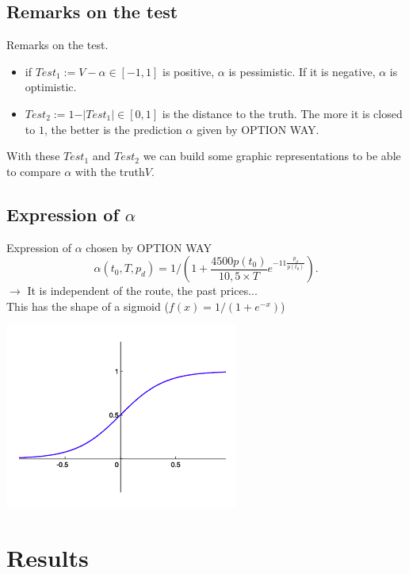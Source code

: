 \documentclass{beamer}
\begin{document}
\subsection{Remarks on the test}
\frame
{
Remarks on the test.
\begin{itemize}
\item if $Test_1:=V-\alpha \in [-1,1]$ is positive, $\alpha$ is pessimistic. If it is negative, $\alpha$ is optimistic.
\item $Test_2:=1-\vert Test_1\vert \in [0,1]$ is the distance to the truth. The more it is closed to $1$, the better is the prediction $\alpha$ given by OPTION WAY. 
\end{itemize}
With these $Test_1$ and $Test_2$ we can build some graphic representations  to be able to compare $\alpha$ with the truth$V$. \\

}
\subsection{Expression of $\alpha$}
\frame
{
Expression of $\alpha$ chosen by OPTION WAY
$$\alpha(t_0,T,p_d)=1/(1+\frac{4500p(t_0)}{10,5\times T}e^{-11\frac{p_d}{p(t_0)}}).$$
$\to$ It is independent of the route, the past prices...\\
This has the shape of a sigmoid ($f(x)=1/(1+e^{-x})$)
\hspace{0.4cm}
\begin{center}
\includegraphics[width=4.cm]{sigmoid.png}
\end{center}
\vspace{-0.4cm}
}


\section{Results}
\end{document}
